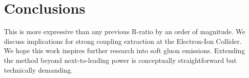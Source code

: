 \section{Conclusions}\label{sec:conclusions}

This is more expressive than any previous R-ratio by an order of
magnitude. We discuss implications for strong coupling extraction at the
Electron-Ion Collider. We hope this work inspires further research into
soft gluon emissions. Extending the method beyond next-to-leading power
is conceptually straightforward but technically demanding.

